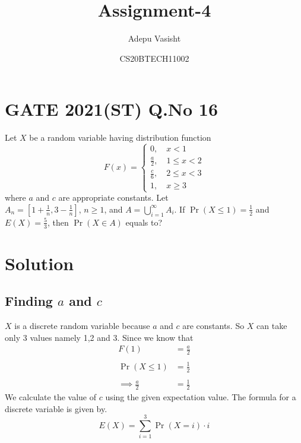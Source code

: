 \documentclass[journal,12pt,twocolumn]{IEEEtran}
\title{Assignment-4}
\author{Adepu Vasisht}
\date{CS20BTECH11002}
\providecommand{\brak}[1]{\ensuremath{\left(#1\right)}}
\begin{document}
\maketitle
\section*{GATE 2021(ST) Q.No 16}
Let $X$ be a random variable having distribution function 
\begin{equation}
\nonumber F(x)=
\begin{cases}
0, \quad x<1\\
\frac{a}{2}, \quad  1\leq x<2\\
\frac{c}{6}, \quad 2\leq x<3\\
1, \quad x\geq3
\end{cases}
\end{equation}
where $a$ and $c$ are appropriate constants. Let\\$A_n = \left[1+\frac{1}{n},3-\frac{1}{n}\right]$, $n\geq1$, and $A = \bigcup_{i=1}^{\infty}A_i$. If $\Pr\brak{X\leq1} = \frac{1}{2}$ and $E\brak{X} = \frac{5}{3}$, then $\Pr\brak{X\in A}$ equals to?

\section*{Solution}
\subsection{Finding $a$ and $c$}
 $X$ is a discrete random variable because $a$ and $c$ are constants. So $X$ can take only 3 values namely 1,2 and 3.
Since we know that 
\begin{align}
 F\brak{1} &= \frac{a}{2}\\
\nonumber \\
 \Pr\brak{X\leq1} &= \frac{1}{2}\\
\nonumber \\
 \implies\frac{a}{2} &= \frac{1}{2}
\end{align}
 We calculate the value of $c$ using the given expectation value. The formula for a discrete variable is given by. 
$$E\brak{X} = \sum_{i=1}^{3}\Pr\brak{X=i}\cdot i$$
\end{document}
